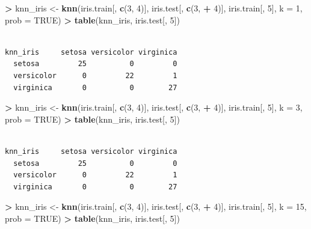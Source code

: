 \documentclass[]{krantz}
\makeatletter
\newenvironment{Shaded}{\begin{snugshade}}{\end{snugshade}}
\newcommand{\DataTypeTok}[1]{\textcolor[rgb]{0.27,0.27,0.27}{#1}}
\newcommand{\DecValTok}[1]{\textcolor[rgb]{0.06,0.06,0.06}{#1}}
\newcommand{\KeywordTok}[1]{\textcolor[rgb]{0.27,0.27,0.27}{\textbf{#1}}}
\newcommand{\NormalTok}[1]{#1}
\newcommand{\OperatorTok}[1]{\textcolor[rgb]{0.43,0.43,0.43}{\textbf{#1}}}
\newcommand{\OtherTok}[1]{\textcolor[rgb]{0.37,0.37,0.37}{#1}}
\newcommand{\StringTok}[1]{\textcolor[rgb]{0.5,0.5,0.5}{#1}}
\newenvironment{kframe}{%
\medskip{}
\setlength{\fboxsep}{.8em}
 \def\at@end@of@kframe{}%
 \ifinner\ifhmode%
  \def\at@end@of@kframe{\end{minipage}}%
  \begin{minipage}{\columnwidth}%
 \fi\fi%
 \def\FrameCommand##1{\hskip\@totalleftmargin \hskip-\fboxsep
 \colorbox{shadecolor}{##1}\hskip-\fboxsep
     \hskip-\linewidth \hskip-\@totalleftmargin \hskip\columnwidth}%
 \MakeFramed {\advance\hsize-\width
   \@totalleftmargin\z@ \linewidth\hsize
   \@setminipage}}%
 {\par\unskip\endMakeFramed%
 \at@end@of@kframe}
\renewenvironment{Shaded}{\begin{kframe}}{\end{kframe}}
\makeatother
\begin{document}
\begin{Shaded}
\begin{Highlighting}[]
\OperatorTok{>}\StringTok{ }\NormalTok{knn_iris <-}\StringTok{ }\KeywordTok{knn}\NormalTok{(iris.train[, }\KeywordTok{c}\NormalTok{(}\DecValTok{3}\NormalTok{, }\DecValTok{4}\NormalTok{)], iris.test[, }\KeywordTok{c}\NormalTok{(}\DecValTok{3}\NormalTok{, }
\OperatorTok{+}\StringTok{   }\DecValTok{4}\NormalTok{)], iris.train[, }\DecValTok{5}\NormalTok{], }\DataTypeTok{k =} \DecValTok{1}\NormalTok{, }\DataTypeTok{prob =} \OtherTok{TRUE}\NormalTok{)}
\OperatorTok{>}\StringTok{ }\KeywordTok{table}\NormalTok{(knn_iris, iris.test[, }\DecValTok{5}\NormalTok{])}
\end{Highlighting}
\end{Shaded}

\begin{verbatim}
            
knn_iris     setosa versicolor virginica
  setosa         25          0         0
  versicolor      0         22         1
  virginica       0          0        27
\end{verbatim}

\begin{Shaded}
\begin{Highlighting}[]
\OperatorTok{>}\StringTok{ }\NormalTok{knn_iris <-}\StringTok{ }\KeywordTok{knn}\NormalTok{(iris.train[, }\KeywordTok{c}\NormalTok{(}\DecValTok{3}\NormalTok{, }\DecValTok{4}\NormalTok{)], iris.test[, }\KeywordTok{c}\NormalTok{(}\DecValTok{3}\NormalTok{, }
\OperatorTok{+}\StringTok{   }\DecValTok{4}\NormalTok{)], iris.train[, }\DecValTok{5}\NormalTok{], }\DataTypeTok{k =} \DecValTok{3}\NormalTok{, }\DataTypeTok{prob =} \OtherTok{TRUE}\NormalTok{)}
\OperatorTok{>}\StringTok{ }\KeywordTok{table}\NormalTok{(knn_iris, iris.test[, }\DecValTok{5}\NormalTok{])}
\end{Highlighting}
\end{Shaded}

\begin{verbatim}
            
knn_iris     setosa versicolor virginica
  setosa         25          0         0
  versicolor      0         22         1
  virginica       0          0        27
\end{verbatim}

\begin{Shaded}
\begin{Highlighting}[]
\OperatorTok{>}\StringTok{ }\NormalTok{knn_iris <-}\StringTok{ }\KeywordTok{knn}\NormalTok{(iris.train[, }\KeywordTok{c}\NormalTok{(}\DecValTok{3}\NormalTok{, }\DecValTok{4}\NormalTok{)], iris.test[, }\KeywordTok{c}\NormalTok{(}\DecValTok{3}\NormalTok{, }
\OperatorTok{+}\StringTok{   }\DecValTok{4}\NormalTok{)], iris.train[, }\DecValTok{5}\NormalTok{], }\DataTypeTok{k =} \DecValTok{15}\NormalTok{, }\DataTypeTok{prob =} \OtherTok{TRUE}\NormalTok{)}
\OperatorTok{>}\StringTok{ }\KeywordTok{table}\NormalTok{(knn_iris, iris.test[, }\DecValTok{5}\NormalTok{])}
\end{Highlighting}
\end{Shaded}
\end{document}
